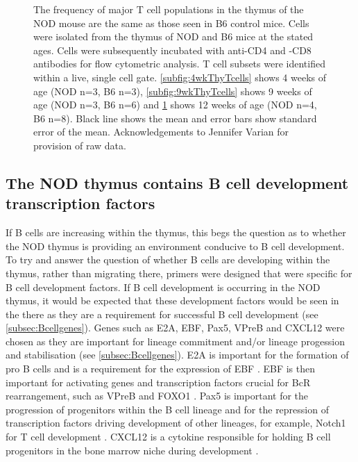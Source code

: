\begin{figure}
\begin{subfigure}{0.5\textwidth}
	\label{subfig:12wkThyTcells}
	\end{subfigure}
\caption[Major T cell subtypes are normal in the NOD mouse thymus]{The frequency of major T cell populations in the thymus of the NOD mouse are the same as those seen in B6 control mice. 
Cells were isolated from the thymus of NOD and B6 mice at the stated ages.
Cells were subsequently incubated with anti-CD4 and -CD8 antibodies for flow cytometric analysis.
T cell subsets were identified within a live, single cell gate.
\ref{subfig:4wkThyTcells} shows 4 weeks of age (NOD n=3, B6 n=3), \ref{subfig:9wkThyTcells} shows 9 weeks of age (NOD n=3, B6 n=6) and \ref{subfig:12wkThyTcells} shows 12 weeks of age (NOD n=4, B6 n=8). Black line shows the mean and error bars show standard error of the mean.
Acknowledgements to Jennifer Varian for provision of raw data.}
\label{fig:NODB6Tcells}
\end{figure}


\subsection{The NOD thymus contains B cell development transcription factors}
\label{subsec:TFs}



If B cells are increasing within the thymus, this begs the question as to whether the NOD thymus is providing an environment conducive to B cell development. 
To try and answer the question of whether B cells are developing within the thymus, rather than migrating there, primers were designed that were specific for B cell development factors.
If B cell development is occurring in the NOD thymus, it would be expected that these development factors would be seen in the there as they are a requirement for successful B cell development (see \cref{subsec:Bcellgenes}).
Genes such as E2A, EBF, Pax5, VPreB and CXCL12 were chosen as they are important for lineage commitment and/or lineage progession and stabilisation (see \cref{subsec:Bcellgenes}).
E2A is important for the formation of pro B cells and is a requirement for the expression of EBF \citep{Welinder2011}.
EBF is then important for activating genes and transcription factors crucial for BcR rearrangement, such as VPreB and FOXO1 \citep{Amin2008}.
Pax5 is important for the progression of progenitors within the B cell lineage and for the repression of transcription factors driving development of other lineages, for example, Notch1 for T cell development \citep{Welinder2011, Souabni2002}.
CXCL12 is a cytokine responsible for holding B cell progenitors in the bone marrow niche during development \citep{Tokoyoda2004}.

